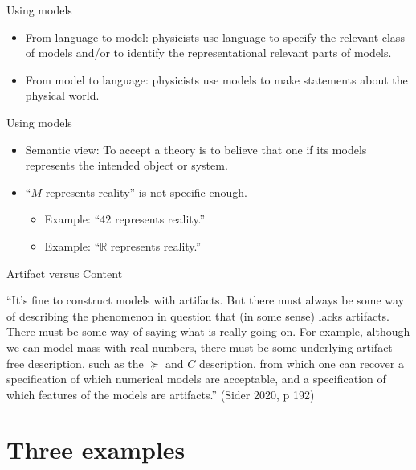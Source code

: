 \documentclass{beamer}
\begin{document}
\begin{frame}{Using models}

  \begin{itemize}
  \item From language to model: physicists use language to specify the
    relevant class of models and/or to identify the representational
    relevant parts of models.
  \item From model to language: physicists use models to make
    statements about the physical world.
  \end{itemize}

\end{frame}

\begin{frame}{Using models}

  \begin{itemize}
  \item Semantic view: To accept a theory is to believe that one if
    its models represents the intended object or system.
  \item ``$M$ represents reality'' is not specific enough.
    \begin{itemize}
    \item Example: ``$42$ represents reality.''
    \item Example: ``$\mathbb{R}$ represents reality.''
    \end{itemize}
  \end{itemize}

\end{frame}

\begin{frame}{Artifact versus Content}

  ``It's fine to construct models with artifacts. But there must
  always be some way of describing the phenomenon in question that (in
  some sense) lacks artifacts. There must be some way of saying what
  is really going on. For example, although we can model mass with
  real numbers, there must be some underlying artifact-free
  description, such as the $\succeq$ and $C$ description, from which
  one can recover a specification of which numerical models are
  acceptable, and a specification of which features of the models are
  artifacts.''  (Sider 2020, p 192)

\end{frame}

  \section{Three examples}
\end{document}
